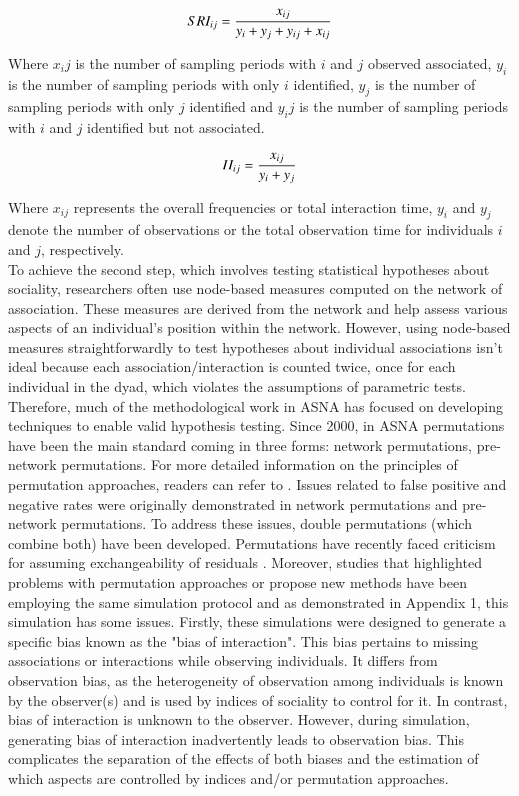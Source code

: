 \documentclass[Afour,sageh,times]{sagej}
\begin{document}
\begin{ceqn}
\begin{align}\label{SRI}
	SRI_{ij} = {x_{ij}\over y_{i}+ y_{j}+ y_{ij}+ x_{ij}}
\end{align}
\end{ceqn}
Where $x_ij$ is the number of sampling periods with $i$ and $j$ observed associated, $y_i$ is the number of sampling periods with only $i$ identified, $y_j$ is the number of sampling periods with only $j$ identified and $y_ij$ is the number of sampling periods with $i$ and $j$ identified but not associated.

\begin{ceqn}
\begin{align}\label{II}
	II_{ij} = {x_{ij} \over y_{i}+ y_{j}}
\end{align}
\end{ceqn}
Where $x_{ij}$ represents the overall frequencies or total interaction time, $y_i$ and $y_j$ denote the number of observations or the total observation time for individuals $i$ and $j$, respectively.\\

To achieve the second step, which involves testing statistical hypotheses about sociality, researchers often use node-based measures computed on the network of association. These measures are derived from the network and help assess various aspects of an individual's position within the network. However, using node-based measures straightforwardly to test hypotheses about individual associations isn't ideal because each association/interaction is counted twice, once for each individual in the dyad, which violates the assumptions of parametric tests. Therefore, much of the methodological work in ASNA has focused on developing techniques to enable valid hypothesis testing. Since 2000, in ASNA permutations have been the main standard coming in three forms: network permutations, pre-network permutations\citep{Farine2013}. For more detailed information on the principles of permutation approaches, readers can refer to \citep{Farine2013, sosa2021reliable}. Issues related to false positive and negative rates were originally demonstrated in network permutations and pre-network permutations. To address these issues, double permutations (which combine both) have been developed. Permutations have recently faced criticism for assuming exchangeability of residuals \citep{Hart2022}. Moreover, studies that highlighted problems with permutation approaches or propose new methods have been employing the same simulation protocol and as demonstrated in Appendix 1, this simulation has some issues. Firstly, these simulations were designed to generate a specific bias known as the "bias of interaction". This bias pertains to missing associations or interactions while observing individuals. It differs from observation bias, as the heterogeneity of observation among individuals is known by the observer(s) and is used by indices of sociality to control for it. In contrast, bias of interaction is unknown to the observer. However, during simulation, generating bias of interaction inadvertently leads to observation bias. This complicates the separation of the effects of both biases and the estimation of which aspects are controlled by indices and/or permutation approaches. 
\end{document}
